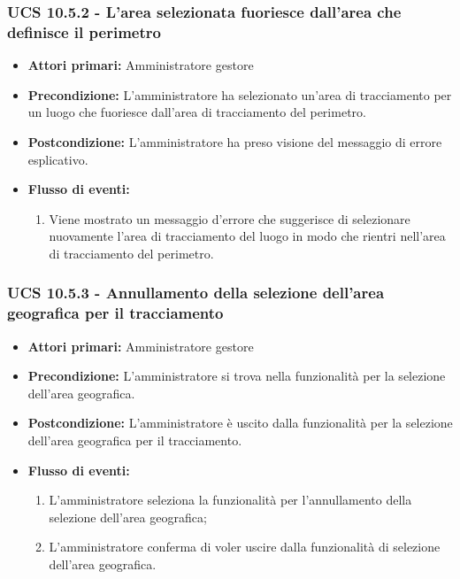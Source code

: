 \subsubsection{UCS 10.5.2 - L'area selezionata fuoriesce dall'area che definisce il perimetro}%
\begin{itemize}
\item \textbf{Attori primari:} Amministratore gestore
\item \textbf{Precondizione:} L'amministratore ha selezionato un'area di tracciamento per un luogo che fuoriesce dall'area di tracciamento del perimetro.
\item \textbf{Postcondizione:} L'amministratore ha preso visione del messaggio di errore esplicativo.
\item \textbf{Flusso di eventi:}
    \begin{enumerate}
    \item Viene mostrato un messaggio d'errore che suggerisce di selezionare nuovamente l'area di tracciamento del luogo in modo che rientri nell'area di tracciamento del perimetro.
    \end{enumerate} 
\end{itemize}

\subsubsection{UCS 10.5.3 - Annullamento della selezione dell'area geografica per il tracciamento}%
\begin{itemize}
\item \textbf{Attori primari:} Amministratore gestore
\item \textbf{Precondizione:} L'amministratore si trova nella funzionalità per la selezione dell'area geografica.
\item \textbf{Postcondizione:} L'amministratore è uscito dalla funzionalità per la selezione dell'area geografica per il tracciamento.
\item \textbf{Flusso di eventi:}
    \begin{enumerate}
    \item L'amministratore seleziona la funzionalità per l'annullamento della selezione dell'area geografica;
    \item L'amministratore conferma di voler uscire dalla funzionalità di selezione dell'area geografica.
    \end{enumerate} 
\end{itemize}

